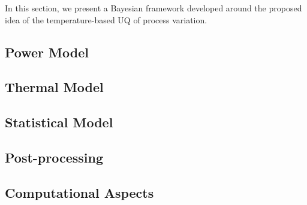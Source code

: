 In this section, we present a Bayesian framework developed around the proposed idea of the temperature-based UQ of process variation.

\subsection{Power Model} 


\subsection{Thermal Model} 


\subsection{Statistical Model} 


\subsection{Post-processing} 


\subsection{Computational Aspects} 

